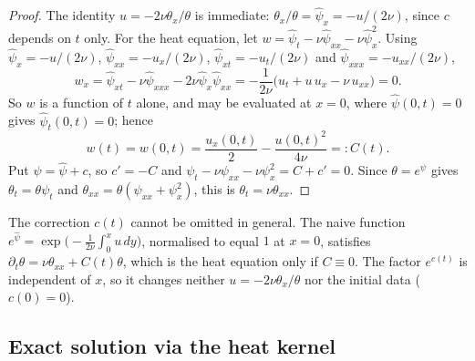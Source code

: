 \begin{proof}
The identity $u=-2\nu\theta_x/\theta$ is immediate: $\theta_x/\theta=
\hat\psi_x=-u/(2\nu)$, since $c$ depends on $t$ only. For the heat
equation, let $w=\hat\psi_t-\nu\hat\psi_{xx}-\nu\hat\psi_x^2$. Using
$\hat\psi_x=-u/(2\nu)$, $\hat\psi_{xx}=-u_x/(2\nu)$,
$\hat\psi_{xt}=-u_t/(2\nu)$ and $\hat\psi_{xxx}=-u_{xx}/(2\nu)$,
\begin{equation}
  w_x=\hat\psi_{xt}-\nu\hat\psi_{xxx}-2\nu\hat\psi_x\hat\psi_{xx}
  =-\frac{1}{2\nu}\big(u_t+u\,u_x-\nu\,u_{xx}\big)=0 .
\end{equation}
So $w$ is a function of $t$ alone, and may be evaluated at $x=0$, where
$\hat\psi(0,t)=0$ gives $\hat\psi_t(0,t)=0$; hence
\begin{equation}
  w(t)=w(0,t)=\frac{u_x(0,t)}{2}-\frac{u(0,t)^2}{4\nu}=:C(t).
\end{equation}
Put $\psi=\hat\psi+c$, so $c'=-C$ and $\psi_t-\nu\psi_{xx}-\nu\psi_x^2=
C+c'=0$. Since $\theta=e^{\psi}$ gives $\theta_t=\theta\psi_t$ and
$\theta_{xx}=\theta(\psi_{xx}+\psi_x^2)$, this is $\theta_t=\nu\theta_{xx}$.
\end{proof}

\begin{remark}
The correction $c(t)$ cannot be omitted in general. The naive function
$e^{\hat\psi}=\exp\big(-\tfrac1{2\nu}\int_0^x u\,dy\big)$, normalised to
equal $1$ at $x=0$, satisfies $\partial_t\theta=\nu\theta_{xx}+C(t)\theta$,
which is the heat equation only if $C\equiv0$. The factor $e^{c(t)}$ is
independent of $x$, so it changes neither $u=-2\nu\theta_x/\theta$ nor the
initial data ($c(0)=0$).
\end{remark}

\subsection{Exact solution via the heat kernel}
\label{subsec:cole-hopf-solution}

